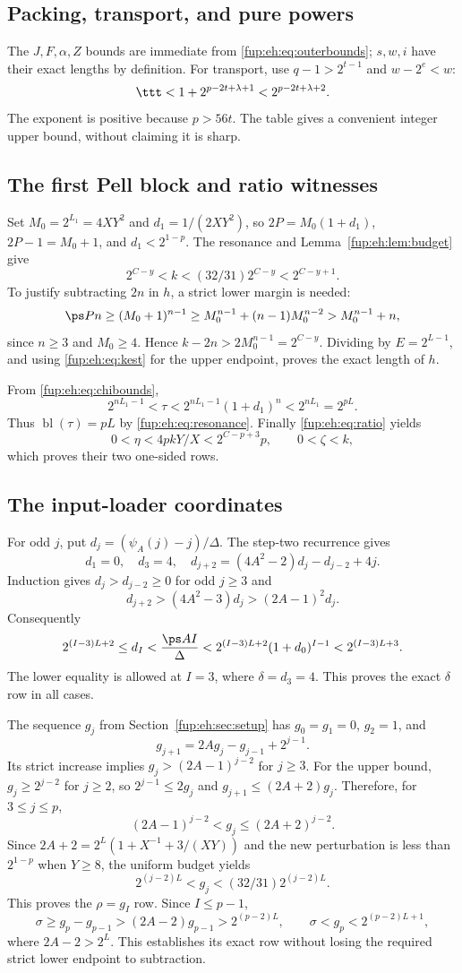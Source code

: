 \documentclass[11pt,letterpaper]{article}
\theoremstyle{definition}\newtheorem{definition}[theorem]{Definition}
\theoremstyle{remark}\newtheorem{remark}[theorem]{Remark}
\newcommand{\D}{\Delta}
\newcommand{\bl}{\operatorname{bl}}
\begin{document}
\subsection{Packing, transport, and pure powers}
The $J,F,\alpha,Z$ bounds are immediate from
\eqref{fup:eh:eq:outerbounds}; $s,w,i$ have their exact lengths by definition.
For transport, use $q-1>2^{t-1}$ and $w-2^e<w$:
\[
 \ttt<1+2^{p-2t+\lambda+1}<2^{p-2t+\lambda+2}.
\]
The exponent is positive because $p>56t$. The table gives a
convenient integer upper bound, without claiming it is sharp.

\subsection{The first Pell block and ratio witnesses}
Set $M_0=2^{L_1}=4XY^2$ and $d_1=1/(2XY^2)$, so
$2P=M_0(1+d_1)$, $2P-1=M_0+1$, and $d_1<2^{1-p}$.
The resonance and Lemma~\ref{fup:eh:lem:budget} give
\begin{equation}\label{fup:eh:eq:kest}
 2^{C-y}<k<(32/31)2^{C-y}<2^{C-y+1}.
\end{equation}
To justify subtracting $2n$ in $h$, a strict lower margin is needed:
\[
 \ps P n\ge(M_0+1)^{n-1}
 \ge M_0^{n-1}+(n-1)M_0^{n-2}>M_0^{n-1}+n,
\]
since $n\ge3$ and $M_0\ge4$. Hence
$k-2n>2M_0^{n-1}=2^{C-y}$. Dividing by $E=2^{L-1}$,
and using \eqref{fup:eh:eq:kest} for the upper endpoint, proves the exact
length of $h$.

From \eqref{fup:eh:eq:chibounds},
\[
 2^{nL_1-1}<\tau<2^{nL_1-1}(1+d_1)^n<2^{nL_1}=2^{pL}.
\]
Thus $\bl(\tau)=pL$ by \eqref{fup:eh:eq:resonance}. Finally
\eqref{fup:eh:eq:ratio} yields
\[
 0<\eta<4pkY/X<2^{C-p+3}p,\qquad 0<\zeta<k,
\]
which proves their two one-sided rows.

\subsection{The input-loader coordinates}
For odd $j$, put $d_j=(\psi_A(j)-j)/\D$. The step-two recurrence gives
\[
 d_1=0,\quad d_3=4,\quad
 d_{j+2}=(4A^2-2)d_j-d_{j-2}+4j.
\]
Induction gives $d_j>d_{j-2}\ge0$ for odd $j\ge3$ and
\[
 d_{j+2}>(4A^2-3)d_j>(2A-1)^2d_j.
\]
Consequently
\[
 2^{(I-3)L+2}\le d_I
 <\frac{\ps A I}{\D}
 <2^{(I-3)L+2}(1+d_0)^{I-1}<2^{(I-3)L+3}.
\]
The lower equality is allowed at $I=3$, where $\delta=d_3=4$.
This proves the exact $\delta$ row in all cases.

The sequence $g_j$ from Section~\ref{fup:eh:sec:setup} has
$g_0=g_1=0$, $g_2=1$, and
\[
 g_{j+1}=2Ag_j-g_{j-1}+2^{j-1}.
\]
Its strict increase implies
$g_j>(2A-1)^{j-2}$ for $j\ge3$.
For the upper bound, $g_j\ge2^{j-2}$ for $j\ge2$, so
$2^{j-1}\le2g_j$ and $g_{j+1}\le(2A+2)g_j$.
Therefore, for $3\le j\le p$,
\[
 (2A-1)^{j-2}<g_j\le(2A+2)^{j-2}.
\]
Since
$2A+2=2^L(1+X^{-1}+3/(XY))$ and the new perturbation is
less than $2^{1-p}$ when $Y\ge8$, the uniform budget yields
\[
 2^{(j-2)L}<g_j<(32/31)2^{(j-2)L}.
\]
This proves the $\rho=g_I$ row. Since $I\le p-1$,
\[
 \sigma\ge g_p-g_{p-1}>(2A-2)g_{p-1}>2^{(p-2)L},
 \qquad \sigma<g_p<2^{(p-2)L+1},
\]
where $2A-2>2^L$. This establishes its exact row without losing
the required strict lower endpoint to subtraction.
\end{document}
